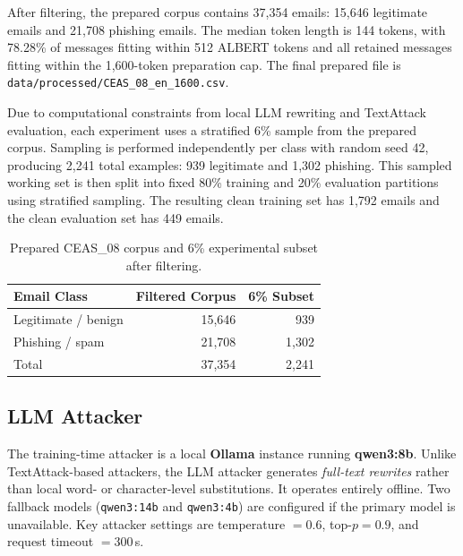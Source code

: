 After filtering, the prepared corpus contains 37,354 emails: 15,646 legitimate emails and 21,708 phishing emails. The median token length is 144 tokens, with 78.28\% of messages fitting within 512 ALBERT tokens and all retained messages fitting within the 1,600-token preparation cap. The final prepared file is \texttt{data/processed/CEAS\_08\_en\_1600.csv}.

Due to computational constraints from local LLM rewriting and TextAttack evaluation, each experiment uses a stratified 6\% sample from the prepared corpus. Sampling is performed independently per class with random seed 42, producing 2,241 total examples: 939 legitimate and 1,302 phishing. This sampled working set is then split into fixed 80\% training and 20\% evaluation partitions using stratified sampling. The resulting clean training set has 1,792 emails and the clean evaluation set has 449 emails.

\begin{table}[t]
  \caption{Prepared CEAS\_08 corpus and 6\% experimental subset after filtering.}
  \label{tab:dataset_summary}
  \begin{center}
    \begin{small}
      \begin{sc}
        \begin{tabular}{lrr}
          \toprule
          Email Class & Filtered Corpus & 6\% Subset \\
          \midrule
          Legitimate / benign & 15,646 & 939 \\
          Phishing / spam     & 21,708 & 1,302 \\
          Total               & 37,354 & 2,241 \\
          \bottomrule
        \end{tabular}
      \end{sc}
    \end{small}
  \end{center}
  \vskip -0.1in
\end{table}


\subsection{LLM Attacker}
The training-time attacker is a local \textbf{Ollama} instance running \textbf{qwen3:8b}. Unlike TextAttack-based attackers, the LLM attacker generates \emph{full-text rewrites} rather than local word- or character-level substitutions. It operates entirely offline. Two fallback models (\texttt{qwen3:14b} and \texttt{qwen3:4b}) are configured if the primary model is unavailable. Key attacker settings are temperature $=0.6$, top-$p=0.9$, and request timeout $=300$\,s.

